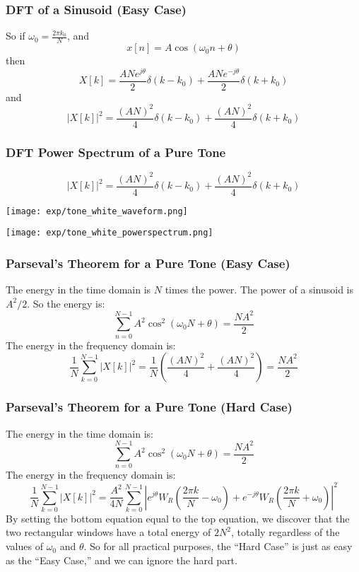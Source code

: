 \begin{frame}
  \frametitle{DFT of a Sinusoid (Easy Case)}
  So if $\omega_0=\frac{2\pi k_0}{N}$, and 
  \[
  x[n] = A\cos(\omega_0 n+\theta)
  \]
  then
  \[
  X[k] = \frac{ANe^{j\theta}}{2}\delta(k-k_0)+\frac{ANe^{-j\theta}}{2}\delta(k+k_0)
  \]
  and
  \[
  |X[k]|^2 = \frac{(AN)^2}{4}\delta(k-k_0)+\frac{(AN)^2}{4}\delta(k+k_0)
  \]
\end{frame}

\begin{frame}
  \frametitle{DFT Power Spectrum of a Pure Tone}
  \[
  |X[k]|^2 = \frac{(AN)^2}{4}\delta(k-k_0)+\frac{(AN)^2}{4}\delta(k+k_0)
  \]
  \centerline{\texttt{[image: exp/tone\_white\_waveform.png]}}
  \centerline{\texttt{[image: exp/tone\_white\_powerspectrum.png]}}
\end{frame}

\begin{frame}
  \frametitle{Parseval's Theorem for a Pure Tone (Easy Case)}

  The energy in the time domain is $N$ times the power.  The power of
  a sinusoid is $A^2/2$.  So the energy is:
  \[
  \sum_{n=0}^{N-1} A^2\cos^2\left(\omega_0 N+\theta\right) = \frac{NA^2}{2}
  \]
  The energy in the frequency domain is:
  \[
  \frac{1}{N}\sum_{k=0}^{N-1} |X[k]|^2 =
  \frac{1}{N}\left(\frac{(AN)^2}{4}+\frac{(AN)^2}{4}\right) =\frac{NA^2}{2}
  \]
\end{frame}

\begin{frame}
  \frametitle{Parseval's Theorem for a Pure Tone (Hard Case)}

  The energy in the time domain is:
  \[
  \sum_{n=0}^{N-1} A^2\cos^2\left(\omega_0 N+\theta\right) = \frac{NA^2}{2}
  \]
  The energy in the frequency domain is:
  \[
  \frac{1}{N}\sum_{k=0}^{N-1} |X[k]|^2 =
  \frac{A^2}{4N}\sum_{k=0}^{N-1}\left|
  e^{j\theta}W_R\left(\frac{2\pi k}{N}-\omega_0\right)+
  e^{-j\theta}W_R\left(\frac{2\pi k}{N}+\omega_0\right)\right|^2
  \]
  By setting the bottom equation equal to the top equation, we discover that
  the two rectangular windows have a total energy of $2N^2$, totally regardless of the values
  of $\omega_0$ and $\theta$.  So for all practical purposes, the ``Hard Case''
  is just as easy as the ``Easy Case,'' and we can ignore the hard part.
\end{frame}
